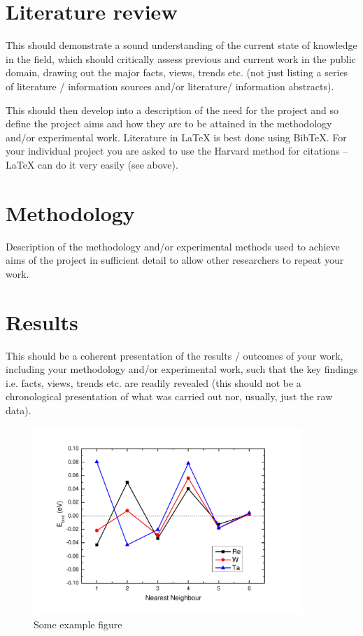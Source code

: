 \documentclass[12pt, letterpaper]{memoir}
\begin{document}
\chapter{Literature review}
This should demonstrate a sound understanding of the current state of knowledge in the field, which should critically assess previous and current work in the public domain, drawing out the major facts, views, trends etc. (not just listing a series of literature / information sources and/or literature/ information abstracts). 

This should then develop into a description of the need for the project and so define the
project aims and how they are to be attained in the methodology and/or experimental work. Literature in \LaTeX{}  is best done using BibTeX. For your individual project you are asked to use the Harvard method for citations -- \LaTeX{} can do it very easily (see above).





\chapter{Methodology}
Description of the methodology and/or experimental methods used to achieve aims of the project in sufficient detail to allow other researchers to repeat your work.





\chapter{Results}
This should be a coherent presentation of the results / outcomes of your work, including your methodology and/or experimental work, such that the key findings i.e. facts, views, trends etc. are readily revealed (this should not be a chronological presentation of what was carried out nor, usually, just the raw data).

\begin{figure}[htbt]
\begin{center}
\includegraphics[width=4in]{Pics/examplefig}
\caption{Some example figure}
\label{examplefig}
\end{center}
\end{figure}
\end{document}
